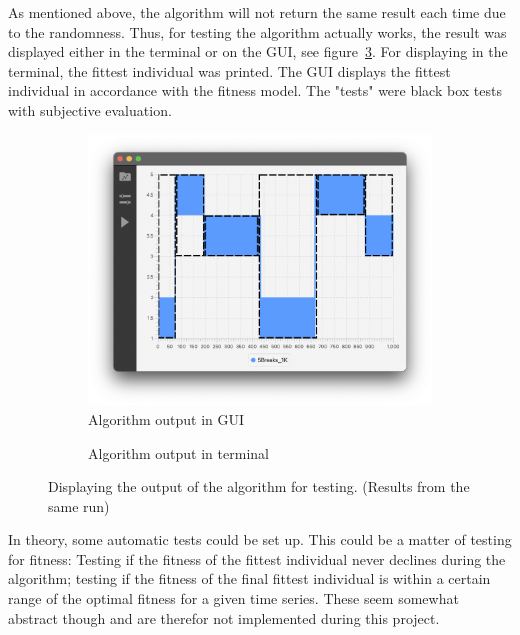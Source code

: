 As mentioned above, the algorithm will not return the same result each time due
to the randomness. Thus, for testing the algorithm actually works, the result
was displayed either in the terminal or on the GUI, see
figure~\ref{fig:bp-locations}. For displaying in the
terminal, the fittest individual was printed. The GUI displays the fittest
individual in accordance with the fitness model. The "tests" were black box
tests with subjective evaluation. 

\begin{figure}[ht]
    \centering
    \begin{subfigure}[b]{.48\textwidth}
        \centering
        \includegraphics[width=\textwidth]{fig/bp-locations-gui.png}
        \caption{Algorithm output in GUI}
        \label{fig:bp-locations-gui}
    \end{subfigure}
    \hfill
    \begin{subfigure}[b]{.48\textwidth}
        \centering
        \caption{Algorithm output in terminal}
        \label{fig:bp-locations-term}
    \end{subfigure}
    \caption{Displaying the output of the algorithm for testing. (Results from the same run)}
    \label{fig:bp-locations}
\end{figure}

In theory, some automatic tests could be set up. This could be a matter of
testing for fitness: Testing if the fitness of the fittest individual never
declines during the algorithm; testing if the fitness of the final fittest
individual is within a certain range of the optimal fitness for a given time
series. These seem somewhat abstract though and are therefor not implemented
during this project. 